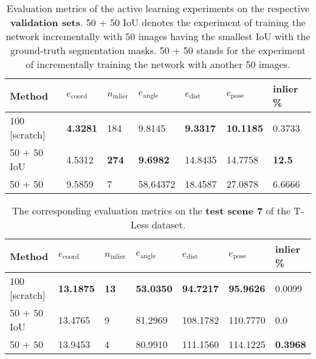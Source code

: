 \begin{table}[]
\centering
\begin{tabular}{|l||llllll|} \hline
Method            & $e_{\text{coord}}$ & $n_{\text{inlier}}$ & $e_{\text{angle}}$ & $e_{\text{dist}}$ & $e_{\text{pose}}$  & inlier \% \\ \hline \hline \rowcolor{Gray}
100 {[}scratch{]} & \textbf{4.3281}             & 184                 & 9.8145             & \textbf{9.3317}            & \textbf{10.1185}      & 0.3733 \\ \hline
50 + 50 IoU       & 4.5312             & \textbf{274}                 & \textbf{9.6982}             & 14.8435           & 14.7758  & \textbf{12.5} \\ \hline \rowcolor{Gray}
50 + 50           & 9.5859             & 7                   & 58.64372           & 18.4587           & 27.0878  &6.6666   \\ \hline      
\end{tabular}
\caption{Evaluation metrics of the active learning experiments on the respective \textbf{validation sets}. 50 + 50 IoU denotes the experiment of training the network incrementally with 50 images having the smallest IoU with the ground-truth segmentation masks. 50 + 50 stands for the experiment of incrementally training the network with another 50 images.}
\label{table:active_learning_val}
\end{table}

\begin{table}[]
\centering
\begin{tabular}{|l||llllll|} \hline
Method            & $e_{\text{coord}}$ & $n_{\text{inlier}}$ & $e_{\text{angle}}$ & $e_{\text{dist}}$ & $e_{\text{pose}}$ & inlier \% \\ \hline \hline \rowcolor{Gray}
100 {[}scratch{]} & \textbf{13.1875}            & \textbf{13}                  & \textbf{53.0350}            & \textbf{94.7217}            & \textbf{95.9626}           & 0.0099    \\ \hline
50 + 50 IoU       & 13.4765            & 9                   & 81.2969            & 108.1782          & 110.7770          & 0.0       \\ \hline \rowcolor{Gray}
50 + 50           & 13.9453            & 4                   & 80.9910            & 111.1560          & 114.1225          &   \textbf{0.3968}  \\ \hline
\end{tabular}
\caption{The corresponding evaluation metrics on the \textbf{test scene 7} of the T-Less dataset.}
\label{table:active_learning_test}
\end{table}

